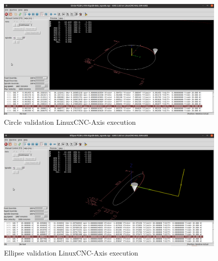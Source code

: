 \clearpage
\pagebreak
\begin{landscape}
	
	\begin{figure}
		\centering
		\caption  {Circle validation LinuxCNC-Axis execution}
		\label{img-Circle validation LinuxCNC-Axis execution}
		\includegraphics[width=1.65\textwidth]{Chap4/Validation/Circle/Circle-FC20-L-018-Algo28-CNC-Validation-Screenshot_2023-10-09_09-46-06.png} 
	\end{figure}
	
	
\end{landscape}

\clearpage
\pagebreak
\begin{landscape}
	
	\begin{figure}
		\centering
		\caption  {Ellipse validation LinuxCNC-Axis execution}
		\label{img-Ellipse validation LinuxCNC-Axis execution}
		\includegraphics[width=1.65\textwidth]{Chap4/Validation/Ellipse/Ellipse-FC20-L-018-Algo28-CNC-Validation-Screenshot_2023-10-09_09-56-34.png} 
	\end{figure}
	
	
\end{landscape}


